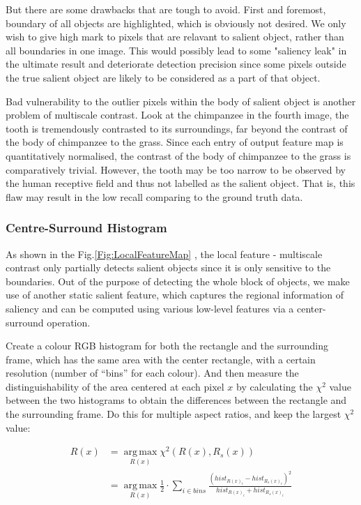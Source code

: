 \documentclass[10pt,twocolumn,letterpaper]{article}
\DeclareMathOperator*{\argmax}{arg\,max}
\newcommand{\SUM}{\sum\limits}
\begin{document}
But there are some drawbacks that are tough to avoid. First and foremost, boundary of all objects are highlighted, which is obviously not desired. We only wish to give high mark to pixels that are relavant to salient object, rather than all boundaries in one image. This would possibly lead to some "saliency leak" in the ultimate result and deteriorate detection precision since some pixels outside the true salient object are likely to be considered as a part of that object.

Bad vulnerability to the outlier pixels within the body of salient object is another problem of multiscale contrast. Look at the chimpanzee in the fourth image, the tooth is tremendously contrasted to its surroundings, far beyond the contrast of the body of chimpanzee to the grass. Since each entry of output feature map is quantitatively normalised, the contrast of the body of chimpanzee to the grass is comparatively trivial. However, the tooth may be too narrow to be observed by the human receptive field and thus not labelled as the salient object. That is, this flaw may result in the low recall comparing to the ground truth data.

\subsubsection{Centre-Surround Histogram}

As shown in the Fig.\ref{Fig:LocalFeatureMap} , the local feature - multiscale contrast only partially detects salient objects since it is only sensitive to the boundaries. Out of the purpose of detecting the whole block of objects, we make use of another static salient feature, which captures the regional information of saliency and can be computed using various low-level features via a center-surround operation. 

Create a colour RGB histogram for both the rectangle and the surrounding frame, which has the same area with the center rectangle, with a certain resolution (number of ``bins'' for each colour). And then measure the distinguishability of the area centered at each pixel $x$ by calculating the $\chi^2$ value between the two histograms to obtain the differences between the rectangle and the surrounding frame.  Do this for multiple aspect ratios, and keep the largest $\chi^2$ value: 

\begin{align*}
R(x) &= \argmax\limits_{R(x)}\chi^2(R(x), R_s(x)) \\ &=\argmax\limits_{R(x)}\frac{1}{2}\cdot\SUM_{i\in bins}\frac{(hist_{R(x)_i}-hist_{R_s(x)_i})^2}{hist_{R(x)_i}+hist_{R_s(x)_i}}
\end{align*}
\end{document}
